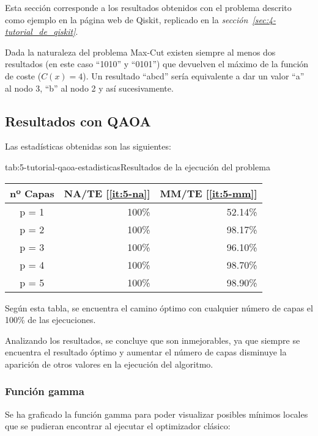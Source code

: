 Esta sección corresponde a los resultados obtenidos con el problema descrito como ejemplo en la página web de Qiskit, replicado en la \textit{sección~\ref{sec:4-tutorial_de_qiskit}}.

Dada la naturaleza del problema Max-Cut existen siempre al menos dos resultados (en este caso ``1010'' y ``0101'') que devuelven el máximo de la función de coste (\(C(x) = 4\)).
Un resultado ``abcd'' sería equivalente a dar un valor ``a'' al nodo 3, ``b'' al nodo 2 y así sucesivamente.

\subsection{Resultados con QAOA}

Las estadísticas obtenidas son las siguientes:

\begin{table}[htbp]{tab:5-tutorial-qaoa-estadisticas}{Resultados de la ejecución del problema~\cite{qiskit_tutorial_antiguo}}
  \begin{tabular}{|c|r|r|}
    \hline
    \textbf{nº Capas} & \textbf{NA/TE} [\ref{it:5-na}] & \textbf{MM/TE} [\ref{it:5-mm}] \\ \hline
    p = 1 & 100\% & 52.14\% \\ \hline
    p = 2 & 100\% & 98.17\% \\ \hline
    p = 3 & 100\% & 96.10\% \\ \hline
    p = 4 & 100\% & 98.70\% \\ \hline
    p = 5 & 100\% & 98.90\% \\ \hline
  \end{tabular}
\end{table}

Según esta tabla, se encuentra el camino óptimo con cualquier número de capas el 100\% de las ejecuciones.

Analizando los resultados, se concluye que son inmejorables, ya que siempre se encuentra el resultado óptimo y aumentar el número de capas disminuye la aparición de otros valores en la ejecución del algoritmo.

\subsubsection{Función gamma}

Se ha graficado la función gamma para poder visualizar posibles mínimos locales que se pudieran encontrar al ejecutar el optimizador clásico:

